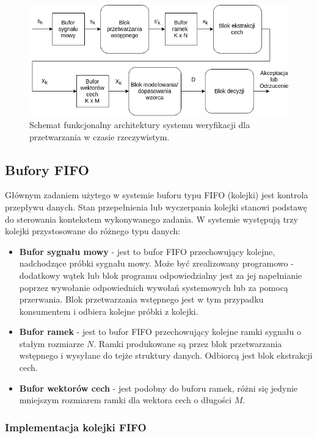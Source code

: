 \begin{figure}[ht!]
  \centering
    \includegraphics[width=1\textwidth]{./overallrt.png}
    \caption{\label{fig:overallrt} Schemat funkcjonalny architektury systemu weryfikacji dla przetwarzania w czasie rzeczywistym.}
\end{figure}

\subsection{Bufory FIFO}

Głównym zadaniem użytego w systemie buforu typu FIFO (kolejki) jest kontrola przepływu danych. Stan przepełnienia lub wyczerpania kolejki stanowi podstawę do sterowania kontekstem wykonywanego zadania. W systemie występują trzy kolejki przystosowane do różnego typu danych:
\begin{itemize}
\item{\textbf{Bufor sygnału mowy}} - jest to bufor FIFO przechowujący kolejne, nadchodzące próbki sygnału mowy. Może być zrealizowany programowo - dodatkowy wątek lub blok programu odpowiedzialny jest za jej napełnianie poprzez wywołanie odpowiednich wywołań systemowych lub za pomocą przerwania. Blok przetwarzania wstępnego jest w tym przypadku konsumentem i odbiera kolejne próbki z kolejki.
\item{\textbf{Bufor ramek}} - jest to bufor FIFO przechowujący kolejne ramki sygnału o stałym rozmiarze $N$. Ramki produkowane są przez blok przetwarzania wstępnego i wysyłane do tejże struktury danych. Odbiorcą jest blok ekstrakcji cech.
\item{\textbf{Bufor wektorów cech}} - jest podobny do buforu ramek, różni się jedynie mniejszym rozmiarem ramki dla wektora cech o długości $M$. 
\end{itemize}

\subsubsection{Implementacja kolejki FIFO}

